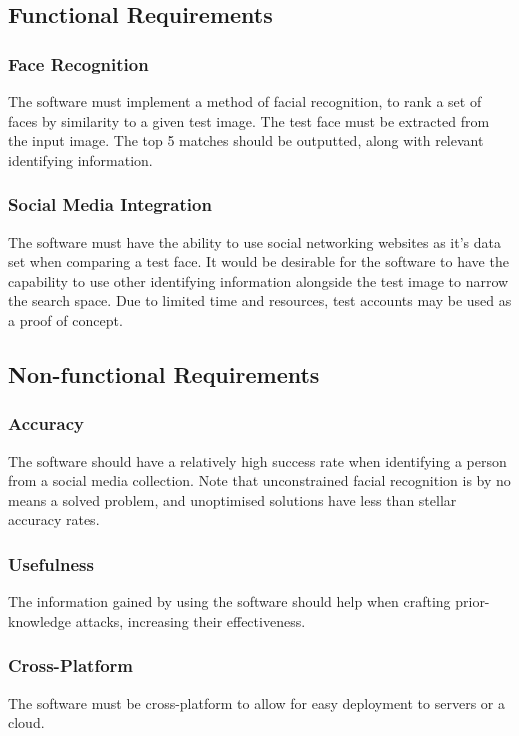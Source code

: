 \documentclass[12pt]{article}
\begin{document}
\subsection{Functional Requirements}
\subsubsection{Face Recognition}
The software must implement a method of facial recognition, to rank a set of faces by similarity to a given test image. The test face must be extracted from the input image. The top 5 matches should be outputted, along with relevant identifying information.

\subsubsection{Social Media Integration}
The software must have the ability to use social networking websites as it's data set when comparing a test face. It would be desirable for the software to have the capability to use other identifying information alongside the test image to narrow the search space. Due to limited time and resources, test accounts may be used as a proof of concept.

\subsection{Non-functional Requirements}
\subsubsection{Accuracy}
The software should have a relatively high success rate when identifying a person from a social media collection. Note that unconstrained facial recognition is by no means a solved problem, and unoptimised solutions have less than stellar accuracy rates.

\subsubsection{Usefulness}
The information gained by using the software should help when crafting prior-knowledge attacks, increasing their effectiveness.

\subsubsection{Cross-Platform}
The software must be cross-platform to allow for easy deployment to servers or a cloud.
\end{document}
